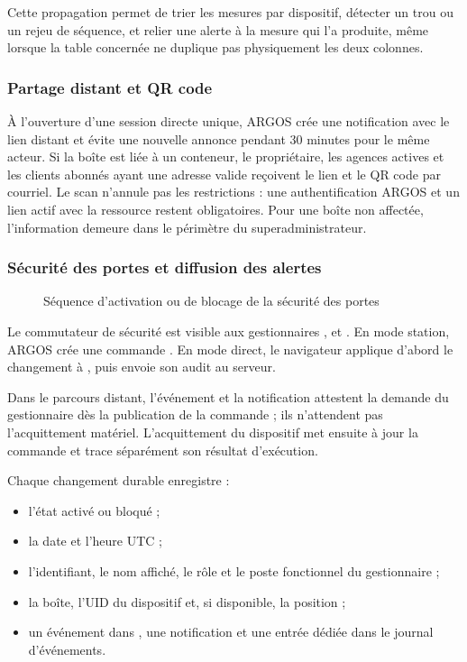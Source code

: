 Cette propagation permet de trier les mesures par dispositif, détecter un
trou ou un rejeu de séquence, et relier une alerte à la mesure qui l'a
produite, même lorsque la table concernée ne duplique pas physiquement les
deux colonnes.

\subsubsection{Partage distant et QR code}

À l'ouverture d'une session directe unique, ARGOS crée une notification avec
le lien distant et évite une nouvelle annonce pendant 30 minutes pour le
même acteur. Si la boîte est liée à un conteneur, le propriétaire, les agences
actives et les clients abonnés ayant une adresse valide reçoivent le lien et
le QR code par courriel. Le scan n'annule pas les restrictions : une
authentification ARGOS et un lien actif avec la ressource restent obligatoires.
Pour une boîte non affectée, l'information demeure dans le périmètre du
superadministrateur.

\subsubsection{Sécurité des portes et diffusion des alertes}

\begin{figure}[htbp]
\centering
\resizebox{0.95\textwidth}{!}{%
}
\caption{Séquence d'activation ou de blocage de la sécurité des portes}
\label{fig-argos-seq-securite}
\tablesourcepromoteurs

\end{figure}

Le commutateur de sécurité est visible aux gestionnaires
,  et . En mode station, ARGOS crée
une commande . En mode direct, le navigateur
applique d'abord le changement à , puis envoie son
audit au serveur.

Dans le parcours distant, l'événement et la notification attestent la demande
du gestionnaire dès la publication de la commande ; ils n'attendent pas
l'acquittement matériel. L'acquittement du dispositif met ensuite à jour la
commande et trace séparément son résultat d'exécution.

Chaque changement durable enregistre :
\begin{itemize}
    \item l'état activé ou bloqué ;
    \item la date et l'heure UTC ;
    \item l'identifiant, le nom affiché, le rôle et le poste fonctionnel du
    gestionnaire ;
    \item la boîte, l'UID du dispositif et, si disponible, la position ;
    \item un événement dans , une notification et une
    entrée dédiée dans le journal d'événements.
\end{itemize}

